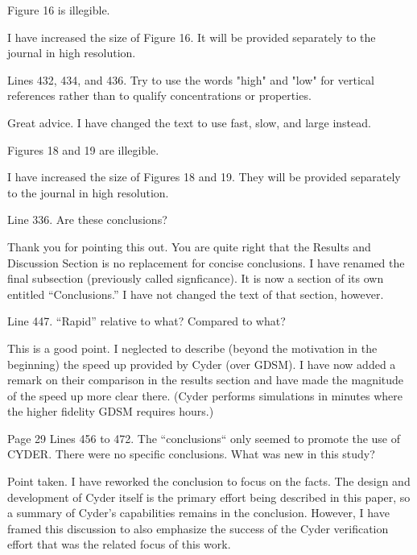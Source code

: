 \documentclass[answers,12pt]{exam}
\begin{document}
\begin{questions}
\question Figure 16 is illegible.
\begin{solution}
I have increased the size of Figure 16.
        It will be provided separately to the journal in high resolution. 
\end{solution}

 

\question Lines 432, 434, and 436. Try to use the words "high" and "low" for vertical references rather than to qualify concentrations or properties.
\begin{solution}
Great advice. I have changed the text to use fast, slow, and large instead.
\end{solution}

 

\question Figures 18 and 19 are illegible.
\begin{solution}
I have increased the size of Figures 18 and 19.
        They will be provided separately to the journal in high resolution. 
\end{solution}

 

\question Line 336. Are these conclusions?
\begin{solution}
Thank you for pointing this out. You are quite right that the Results and 
        Discussion Section is no replacement for concise conclusions. I have 
        renamed the final subsection (previously called signficance). It is now 
        a section of its own entitled ``Conclusions.'' I have not changed the 
        text of that section, however. 
\end{solution}

 

\question Line 447. ``Rapid'' relative to what? Compared to what?
\begin{solution}
        This is a good point. I neglected to describe (beyond the motivation in 
        the beginning) the speed up provided by Cyder (over GDSM). I have now 
        added a remark on their comparison in the results section and have made 
        the magnitude of the speed up more clear there. (Cyder performs 
        simulations in minutes where the higher fidelity GDSM requires hours.) 
\end{solution}

 

\question Page 29 Lines 456 to 472. The ``conclusions`` only seemed to promote the use of CYDER. There were no specific conclusions. What was new in this study? 
\begin{solution}
Point taken. I have reworked the conclusion to focus on the facts. The 
        design and development of Cyder itself is the primary effort being 
        described in this paper, so a summary of Cyder's capabilities remains 
        in the conclusion. However, I have framed this discussion to also 
        emphasize the success of the Cyder verification effort that was the related 
        focus of this work.
\end{solution}



\end{questions}
\end{document}
